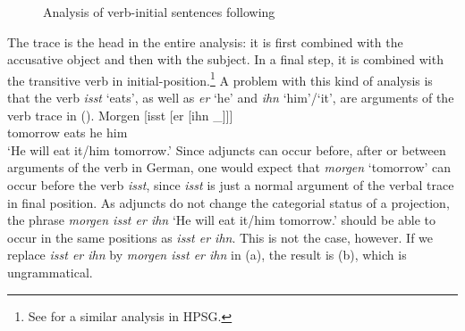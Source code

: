 \begin{figure}
\caption{\label{Abbildung-CG-isst-der-junge-den-kuchen-jacobs}Analysis of verb-initial sentences following \citet{Jacobs91a}}
\end{figure}%
The trace is the head in the entire analysis: it is first combined with the accusative object and then with the subject. In a final step,
it is combined with the transitive verb in initial-position.\footnote{%
 See  for a similar analysis in HPSG\indexhpsg.
} 
A problem with this kind of analysis is that the verb \emph{isst} `eats', as well as \emph{er} `he' and
\emph{ihn} `him'/`it', are arguments of the verb trace in ().
\ea
\gll Morgen [isst [er [ihn \_]]]\\
	 tomorrow \spacebr{}eats \spacebr{}he \spacebr{}him\\
\glt `He will eat it/him tomorrow.'
\z
\addlines[2]
Since adjuncts can occur before, after or between arguments of the verb in German, one would expect that \emph{morgen} `tomorrow' can occur before the verb
\emph{isst}, since \emph{isst} is just a normal argument of the verbal trace in final position. As
adjuncts do not change the categorial status of a projection, the phrase \emph{morgen isst er ihn}
`He will eat it/him tomorrow.' should be able to
occur in the same positions as \emph{isst er ihn}. This is not the case, however. If we replace
\emph{isst er ihn} by \emph{morgen isst er ihn} in (a), the result is (b), which is ungrammatical.
\eal
{}
